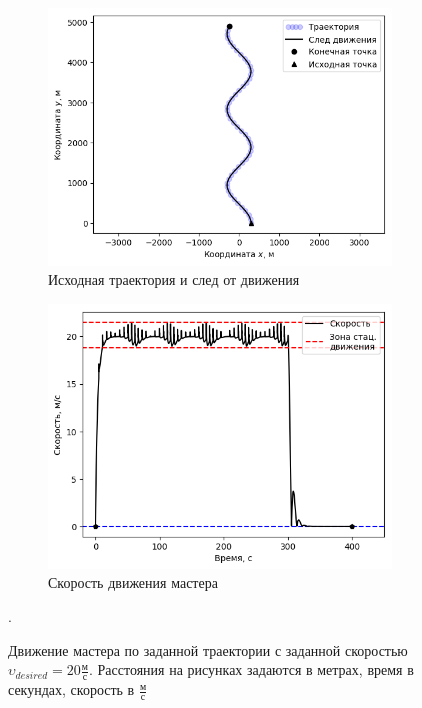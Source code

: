 \documentclass[a4paper, 14pt]{extarticle}
\begin{document}
\begin{figure}[!htbp]
	\centering
	\begin{subfigure}{.5\textwidth}
		\centering
		\includegraphics[width=1\linewidth]{master-trajectory-0}
		\caption{Исходная траектория и след от движения}
		\label{fig:sub1}
	\end{subfigure}%
	\begin{subfigure}{.5\textwidth}
		\centering
		\includegraphics[width=1\linewidth]{master-trajectory-0-velocity}
		\caption{Скорость движения мастера}
		\label{fig:sub2}
	\end{subfigure}
	\caption{Движение мастера по заданной траектории с заданной скоростью $\upsilon_{desired} = 20 \frac{\text{м}}{\text{с}}$. Расстояния на рисунках задаются в метрах, время в секундах, скорость в $\frac{\text{м}}{\text{с}}$}.
	\label{fig:test}
\end{figure}
\end{document}
